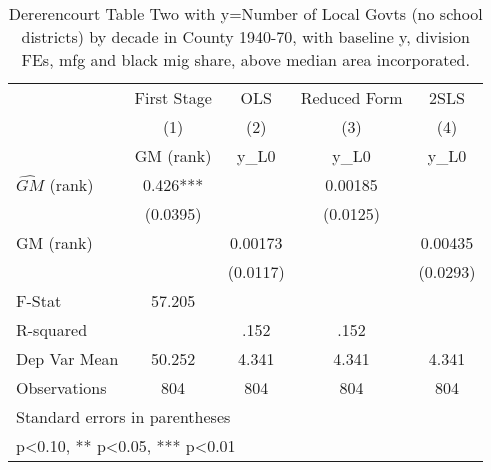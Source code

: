 \begin{table}[htbp]\centering
\def\sym#1{\ifmmode^{#1}\else\(^{#1}\)\fi}
\caption{Dererencourt Table Two with y=Number of Local Govts (no school districts) by decade in County 1940-70, with baseline y, division FEs, mfg and black mig share, above median area incorporated.}
\begin{tabular}{l*{4}{c}}
\toprule
                    & First Stage   &         OLS   &Reduced Form   &        2SLS   \\
                    &\multicolumn{1}{c}{(1)}&\multicolumn{1}{c}{(2)}&\multicolumn{1}{c}{(3)}&\multicolumn{1}{c}{(4)}\\
                    &\multicolumn{1}{c}{GM  (rank)}&\multicolumn{1}{c}{y\_L0}&\multicolumn{1}{c}{y\_L0}&\multicolumn{1}{c}{y\_L0}\\
\midrule
$\hat{GM}$ (rank)   &       0.426***&               &     0.00185   &               \\
                    &    (0.0395)   &               &    (0.0125)   &               \\
\addlinespace
GM  (rank)          &               &     0.00173   &               &     0.00435   \\
                    &               &    (0.0117)   &               &    (0.0293)   \\
\midrule
F-Stat              &      57.205   &               &               &               \\
R-squared           &               &        .152   &        .152   &               \\
Dep Var Mean        &      50.252   &       4.341   &       4.341   &       4.341   \\
Observations        &         804   &         804   &         804   &         804   \\
\bottomrule
\multicolumn{5}{l}{\footnotesize Standard errors in parentheses}\\
\multicolumn{5}{l}{\footnotesize * p<0.10, ** p<0.05, *** p<0.01}\\
\end{tabular}
\end{table}

